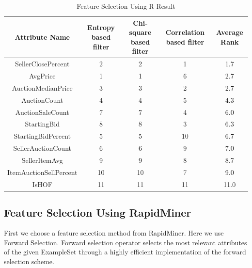 \documentclass[CEJM,PDF]{cej} %
\begin{document}
\begin{table}[h]
\centering
\caption{Feature Selection Using R Result}
\label{r-rank}
\begin{tabular}{@{}ccccc@{}}
\toprule
Attribute Name         & Entropy based filter & Chi-square based filter & Correlation based filter & Average Rank \\ \midrule
SellerClosePercent     & 2                    & 2                       & 1                        & 1.7     \\
AvgPrice               & 1                    & 1                       & 6                        & 2.7     \\
AuctionMedianPrice     & 3                    & 3                       & 2                        & 2.7     \\
AuctionCount           & 4                    & 4                       & 5                        & 4.3     \\
AuctionSaleCount       & 7                    & 7                       & 4                        & 6.0     \\
StartingBid            & 8                    & 8                       & 3                        & 6.3     \\
StartingBidPercent     & 5                    & 5                       & 10                       & 6.7     \\
SellerAuctionCount     & 6                    & 6                       & 9                        & 7.0     \\
SellerItemAvg          & 9                    & 9                       & 8                        & 8.7     \\
ItemAuctionSellPercent & 10                   & 10                      & 7                        & 9.0     \\
IsHOF                  & 11                   & 11                      & 11                       & 11.0    \\ \bottomrule
\end{tabular}
\end{table}

\subsection{Feature Selection Using RapidMiner}
First we choose a feature selection method from RapidMiner. Here we use Forward Selection. Forward selection operator selects the most relevant attributes of the given ExampleSet through a highly efficient implementation of the forward selection scheme. 
\end{document}
